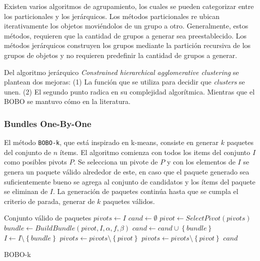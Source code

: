 Existen varios algoritmos de agrupamiento, los cuales se pueden categorizar entre los particionales y los jerárquicos. Los métodos particionales re ubican iterativamente los objetos moviéndolos de un grupo a otro. Generalmente, estos métodos, requieren que la cantidad de grupos a generar sea preestablecido. Los métodos jerárquicos construyen los grupos mediante la partición recursiva de los grupos de objetos y no requieren predefinir la cantidad de grupos a generar.

Del algoritmo jerárquico \textit{Constrained hierarchical agglomerative clustering} se plantean dos mejoras: (1) La función que se utiliza para decidir que \textit{clusters} se unen. (2) El segundo punto radica en su complejidad algorítmica. Mientras que el BOBO se mantuvo cómo en la literatura.

\subsubsection{Bundles One-By-One}
El método \texttt{BOBO-k}, que está inspirado en k-means, consiste en generar $k$ paquetes del conjunto de $n$ ítems. El algoritmo comienza con todos los items del conjunto $I$ como posibles pivots $P$. Se selecciona un pivote de $P$ y con los elementos de $I$ se genera un paquete válido alrededor de este, en caso que el paquete generado sea suficientemente bueno se agrega al conjunto de candidatos y los ítems del paquete se eliminan de $I$. La generación de paquetes continúa hasta que se cumpla el criterio de parada, generar de $k$ paquetes válidos.\\

\begin{algorithm}[H]
\begin{algorithmic}[1]
\ENSURE Conjunto válido de paquetes
\STATE $pivots \leftarrow I$
\STATE $cand \leftarrow \emptyset$
	\STATE $pivot \leftarrow SelectPivot(pivots)$
	\STATE $bundle \leftarrow BuildBundle(pivot,I,\alpha,f,\beta)$
		\STATE $cand \leftarrow cand \cup \left\{bundle\right\}$
		\STATE $I \leftarrow I \setminus \left\{bundle\right\}$
		\STATE $pivots \leftarrow pivots \setminus \left\{pivot\right\}$
	\ELSE
		\STATE $pivots \leftarrow pivots \setminus \left\{pivot\right\}$
	\ENDIF
\ENDWHILE
\RETURN $cand$
\end{algorithmic}
\caption{BOBO-k}\label{alg:bobo}
\end{algorithm}

